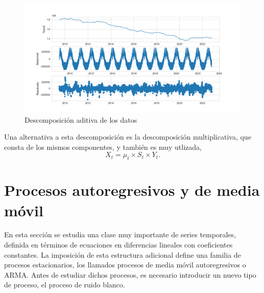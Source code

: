 \documentclass[12pt,twoside]{article}
\begin{document}
\begin{figure} 
    \includegraphics[width = \textwidth]{imagenes/Decomposition.png}
    \caption{Descomposición aditiva de los datos}\label{fig:Decomposition}
\end{figure}



Una alternativa a esta descomposición es la descomposición multiplicativa, que consta de los mismos componentes, y también es muy utlizada, 
\begin{equation}\label{eq:descom3}
    X_t = \mu_t \times S_t \times Y_t.
\end{equation}



\newpage
\section{Procesos autoregresivos y de media móvil}
En esta sección se estudia una clase muy importante de series temporales, definida en términos de ecuaciones en diferencias lineales con coeficientes constantes. La imposición de esta estructura adicional define una familia de procesos estacionarios, los llamados procesos de media móvil autoregresivos o ARMA. Antes de estudiar dichos procesos, es necesario introducir un nuevo tipo de proceso, el proceso de ruido blanco.
\end{document}
